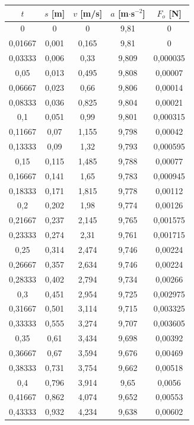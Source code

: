 \documentclass{fkssolpub}
\begin{document}
\begin{table}[h!]
\begin{subtable}[c]{0.5\textwidth}
	\end{subtable}
	\begin{subtable}[c]{0.5\textwidth}
		\label{tab:c}
		\begin{tabular}{|c|c|c|c|c|}
			\hline
			$t$ & $s$ [m] & $v$ [m/s] & $a$ [m$\cdot$s$^{-2}$]& $F_o$ [N] \\
			\hline
0 & 0 & 0 & 9,81 & 0 \\
0,01667 & 0,001 & 0,165 & 9,81 & 0 \\
0,03333 & 0,006 & 0,33 & 9,809 & 0,000035 \\
0,05 & 0,013 & 0,495 & 9,808 & 0,00007 \\
0,06667 & 0,023 & 0,66 & 9,806 & 0,00014 \\
0,08333 & 0,036 & 0,825 & 9,804 & 0,00021 \\
0,1 & 0,051 & 0,99 & 9,801 & 0,000315 \\
0,11667 & 0,07 & 1,155 & 9,798 & 0,00042 \\
0,13333 & 0,09 & 1,32 & 9,793 & 0,000595 \\
0,15 & 0,115 & 1,485 & 9,788 & 0,00077 \\
0,16667 & 0,141 & 1,65 & 9,783 & 0,000945 \\
0,18333 & 0,171 & 1,815 & 9,778 & 0,00112 \\
0,2 & 0,202 & 1,98 & 9,774 & 0,00126 \\
0,21667 & 0,237 & 2,145 & 9,765 & 0,001575 \\
0,23333 & 0,274 & 2,31 & 9,761 & 0,001715 \\
0,25 & 0,314 & 2,474 & 9,746 & 0,00224 \\
0,26667 & 0,357 & 2,634 & 9,746 & 0,00224 \\
0,28333 & 0,402 & 2,794 & 9,734 & 0,00266 \\
0,3 & 0,451 & 2,954 & 9,725 & 0,002975 \\
0,31667 & 0,501 & 3,114 & 9,715 & 0,003325 \\
0,33333 & 0,555 & 3,274 & 9,707 & 0,003605 \\
0,35 & 0,61 & 3,434 & 9,698 & 0,00392 \\
0,36667 & 0,67 & 3,594 & 9,676 & 0,00469 \\
0,38333 & 0,731 & 3,754 & 9,662 & 0,00518 \\
0,4 & 0,796 & 3,914 & 9,65 & 0,0056 \\
0,41667 & 0,862 & 4,074 & 9,652 & 0,00553 \\
0,43333 & 0,932 & 4,234 & 9,638 & 0,00602 \\

\end{tabular}
\end{subtable}
\end{table}
\end{document}

